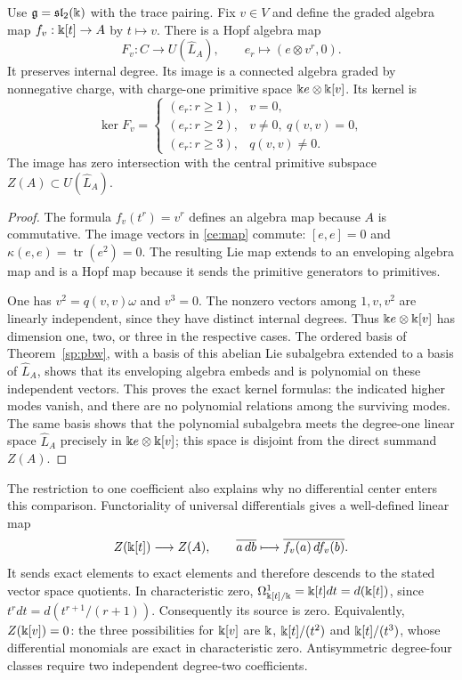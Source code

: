 \begin{proposition}
\label{ce:specialization}
Use $\mathfrak g=\mathfrak{sl}_2(\Bbbk)$ with the trace pairing.
Fix $v\in V$ and define the graded algebra map
$f_v:\Bbbk[t]\to A$ by $t\mapsto v$.  There is a Hopf algebra map
\begin{equation}\label{ce:map}
 F_v:C\longrightarrow U(\widehat L_A),\qquad
 e_r\longmapsto(e\otimes v^r,0).
\end{equation}
It preserves internal degree.  Its image is a connected algebra graded
by nonnegative charge, with charge-one primitive space
$\Bbbk e\otimes \Bbbk[v]$.  Its kernel is
\[
 \ker F_v=
 \begin{cases}
  (e_r:r\ge1),&v=0,\\
  (e_r:r\ge2),&v\ne0,\ q(v,v)=0,\\
  (e_r:r\ge3),&q(v,v)\ne0.
 \end{cases}
\]
The image has zero intersection with the central primitive subspace
$Z(A)\subset U(\widehat L_A)$.
\end{proposition}

\begin{proof}
The formula $f_v(t^r)=v^r$ defines an algebra map because $A$ is
commutative.  The image vectors in \eqref{ce:map} commute:
$[e,e]=0$ and $\kappa(e,e)=\operatorname{tr}(e^2)=0$.
The resulting Lie map extends to an enveloping algebra map and is a
Hopf map because it sends the primitive generators to primitives.

One has $v^2=q(v,v)\omega$ and $v^3=0$.  The nonzero vectors among
$1,v,v^2$ are linearly independent, since they have distinct internal
degrees.  Thus $\Bbbk e\otimes \Bbbk[v]$ has dimension one, two, or three in
the respective cases.  The ordered basis of Theorem~\ref{sp:pbw},
with a basis of this abelian Lie subalgebra extended
to a basis of $\widehat L_A$, shows that its enveloping algebra embeds
and is polynomial on these independent vectors.  This proves the exact
kernel formulas: the indicated higher modes vanish, and there are no
polynomial relations among the surviving modes.  The same basis shows
that the polynomial subalgebra meets the degree-one linear space
$\widehat L_A$ precisely in $\Bbbk e\otimes \Bbbk[v]$; this space is disjoint
from the direct summand $Z(A)$.
\end{proof}

The restriction to one coefficient also explains why no differential
center enters this comparison.  Functoriality of universal differentials
gives a well-defined linear map
\[
 Z(\Bbbk[t])\longrightarrow Z(A),\qquad
 \overline{a\,db}\longmapsto
 \overline{f_v(a)\,d f_v(b)}.
\]
It sends exact elements to exact elements and therefore descends to the
stated vector space quotients.  In characteristic zero,
$\Omega^1_{\Bbbk[t]/\Bbbk}=\Bbbk[t]dt=d(\Bbbk[t])$, since
$t^r dt=d(t^{r+1}/(r+1))$.  Consequently its source is zero.
Equivalently, $Z(\Bbbk[v])=0$: the three possibilities for $\Bbbk[v]$ are
$\Bbbk$, $\Bbbk[t]/(t^2)$ and $\Bbbk[t]/(t^3)$, whose differential monomials are
exact in characteristic zero.  Antisymmetric degree-four classes require
two independent degree-two coefficients.

